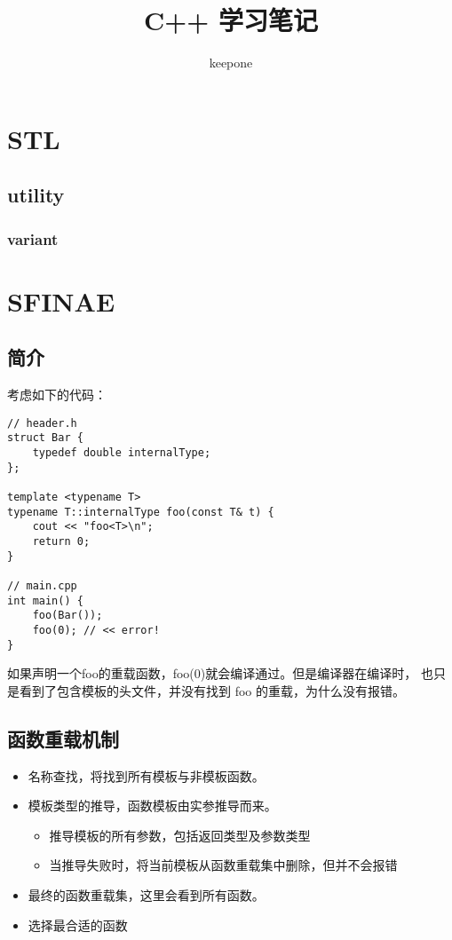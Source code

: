 \documentclass{article}
\title{C++ 学习笔记}
\author{keepone}
\begin{document}
\maketitle
\newpage 

\tableofcontents \label{TABLE}
\newpage

\section{STL}
\subsection{utility}
\subsubsection{variant}


\newpage 

\section{SFINAE}
\subsection{简介}

考虑如下的代码：

\begin{verbatim}
// header.h
struct Bar {
    typedef double internalType;  
};

template <typename T> 
typename T::internalType foo(const T& t) { 
    cout << "foo<T>\n"; 
    return 0; 
}

// main.cpp
int main() {
    foo(Bar());
    foo(0); // << error!
}
\end{verbatim}

如果声明一个foo的重载函数，foo(0)就会编译通过。但是编译器在编译时，
也只是看到了包含模板的头文件，并没有找到 foo 的重载，为什么没有报错。


\subsection{函数重载机制}
\begin{itemize}
    \item 名称查找，将找到所有模板与非模板函数。
    \item 模板类型的推导，函数模板由实参推导而来。
    \begin{itemize}
        \item 推导模板的所有参数，包括返回类型及参数类型
        \item 当推导失败时，将当前模板从函数重载集中删除，但并不会报错
    \end{itemize}
    \item 最终的函数重载集，这里会看到所有函数。
    \item 选择最合适的函数
\end{itemize}
\end{document}
